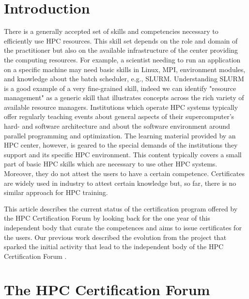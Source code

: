 \documentclass[jocse]{jocseart}
\begin{document}
\keywords{}

\maketitle

\section{Introduction}

There is a generally accepted set of skills and competencies necessary to efficiently use HPC resources.
This skill set depends on the role and domain of the practitioner but also on the available infrastructure of the center providing the computing resources.
For example, a scientist needing to run an application on a specific machine may need basic skills in Linux, MPI, environment modules, and knowledge about the batch scheduler, e.g., SLURM.
Understanding SLURM is a good example of a very fine-grained skill, indeed we can identify "resource management" as a generic skill that illustrates concepts across the rich variety of available resource managers.
Institutions which operate HPC systems typically offer regularly teaching events about general aspects of their supercomputer's hard- and software architecture and about the software environment around parallel programming and optimization.
The learning material provided by an HPC center, however, is geared to the special demands of the institutions they support and its specific HPC environment.
This content typically covers a small part of basic HPC skills which are necessary to use other HPC systems.
Moreover, they do not attest the users to have a certain competence.
Certificates are widely used in industry to attest certain knowledge but, so far, there is no similar approach for HPC training.

This article describes the current status of the certification program offered by the HPC Certification Forum by looking back for the one year of this independent body that curate the competences and aims to issue certificates for the users.
Our previous work described the evolution from the project that sparked the initial activity that lead to the independent body of the HPC Certification Forum \cite{TAHCPKHHSS19}.


\section{The HPC Certification Forum}
\end{document}
